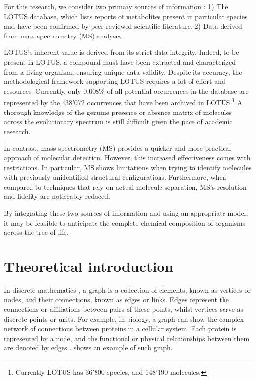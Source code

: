 \documentclass[
11pt, %
oneside, %
english, %
singlespacing, %
headsepline, %
chapterinoneline, %
]{MastersDoctoralThesis} %
\begin{document}
For this research, we consider two primary sources of information : 1) The LOTUS database, which lists reports of metabolites present in particular species and have been confirmed by peer-reviewed scientific literature. 2) Data derived from mass spectrometry (MS) analyses.

LOTUS's inherent value is derived from its strict data integrity. Indeed, to be present in LOTUS, a compound must have been extracted and characterized from a living organism, ensuring unique data validity. Despite its accuracy, the methodological framework supporting LOTUS requires a lot of effort and resources. Currently, only 0.008\% of all potential occurrences in the database are represented by the 438'072 occurrences that have been archived in LOTUS.\footnote{Currently LOTUS has $36'800$ species, and $148'190$ molecules.} A thorough knowledge of the genuine presence or absence matrix of molecules across the evolutionary spectrum is still difficult given the pace of academic research.

In contrast, mass spectrometry (MS) provides a quicker and more practical approach of molecular detection. However, this increased effectiveness comes with restrictions. In particular, MS shows limitations when trying to identify molecules with previously unidentified structural configurations. Furthermore, when compared to techniques that rely on actual molecule separation, MS's resolution and fidelity are noticeably reduced.

By integrating these two sources of information and using an appropriate model, it may be feasible to anticipate the complete chemical composition of organisms across the tree of life. 




\chapter{Theoretical introduction}\label{chap:Theoretical introduction}
In discrete mathematics \cite{johnsonbaughDiscreteMathematics2018}, a graph is a collection of elements, known as vertices or nodes, and their connections, known as edges or links. Edges represent the connections or affiliations between pairs of these points, whilst vertices serve as discrete points or units. For example, in biology, a graph can show the complex network of connections between proteins in a cellular system. Each protein is represented by a node, and the functional or physical relationships between them are denoted by edges \cite{trudeauIntroductionGraphTheory1993}.  shows an example of such graph.
\end{document}
